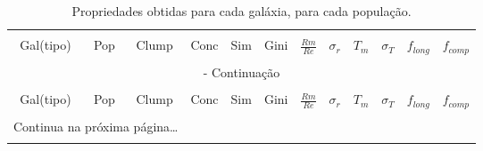\begin{center}
\setcaptionmargin{1cm}
\scriptsize
\begin{longtable}{lccccccccccc}
\caption[Exemplo de tabela.]{Propriedades obtidas para cada galáxia, para cada população. }\\
\hline \hline \\[-2ex]
\multicolumn{1}{c}{Gal(tipo)} &
\multicolumn{1}{c}{Pop} &
\multicolumn{1}{c}{Clump} &
\multicolumn{1}{c}{Conc} &
\multicolumn{1}{c}{Sim} &
\multicolumn{1}{c}{Gini} &
\multicolumn{1}{c}{$\frac{Rm}{Re}$} &
\multicolumn{1}{c}{$\sigma_r$} &
\multicolumn{1}{c}{$T_m$} &
\multicolumn{1}{c}{$\sigma_T$} &
\multicolumn{1}{c}{$f_{long}$} &
\multicolumn{1}{c}{$f_{comp}$} 

\\[0.5ex] \hline
\\[-1.8ex]

\endfirsthead

\multicolumn{12}{c}{\footnotesize{{\slshape{{\tablename} \thetable{}}} - Continuação}}\\[0.5ex]

\hline \hline\\[-2ex]

\multicolumn{1}{c}{Gal(tipo)} &
\multicolumn{1}{c}{Pop} &
\multicolumn{1}{c}{Clump} &
\multicolumn{1}{c}{Conc} &
\multicolumn{1}{c}{Sim} &
\multicolumn{1}{c}{Gini} &
\multicolumn{1}{c}{$\frac{Rm}{Re}$} &
\multicolumn{1}{c}{$\sigma_r$} &
\multicolumn{1}{c}{$T_m$} &
\multicolumn{1}{c}{$\sigma_T$} &
\multicolumn{1}{c}{$f_{long}$} &
\multicolumn{1}{c}{$f_{comp}$} 
\\[0.5ex] \hline
\\[-1.8ex]

\endhead

\multicolumn{3}{l}{{\footnotesize{Continua na próxima página\ldots}}}\\
\endfoot
\hline


\end{longtable}
\end{center}
